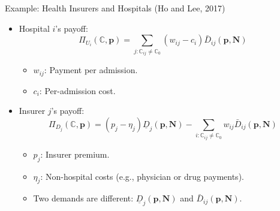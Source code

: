 \documentclass[aspectratio=169]{beamer}  %
\begin{document}
\begin{frame}{Example: Health Insurers and Hospitals (Ho and Lee, 2017)}
    \begin{itemize}
        \item Hospital \(i\)'s payoff:
        \[
        \Pi_{U_i}(\mathbb{C}, \boldsymbol{p}) = \sum_{j : \mathbb{C}_{ij} \neq \mathbb{C}_0} \left(w_{ij} - c_i\right) \bar{D}_{ij}(\boldsymbol{p}, \boldsymbol{N})
        \]
        \begin{itemize}
            \item \(w_{ij}\): Payment per admission.
            \item \(c_i\): Per-admission cost.
        \end{itemize}
        
        \item Insurer \(j\)'s payoff:
        \[
        \Pi_{D_j}(\mathbb{C}, \boldsymbol{p}) = \left(p_j - \eta_j\right) \underline{D}_j(\boldsymbol{p}, \boldsymbol{N}) - \sum_{i : \mathbb{C}_{ij} \neq \mathbb{C}_0} w_{ij} \bar{D}_{ij}(\boldsymbol{p}, \boldsymbol{N})
        \]
        \begin{itemize}
            \item \(p_j\): Insurer premium.
            \item \(\eta_j\): Non-hospital costs (e.g., physician or drug payments).
            \item Two demands are different: \(\underline{D}_j(\boldsymbol{p}, \boldsymbol{N})\) and \(\bar{D}_{ij}(\boldsymbol{p}, \boldsymbol{N})\).
        \end{itemize}
        
    \end{itemize}
\end{frame}
\end{document}

